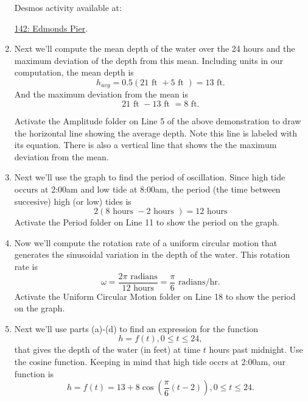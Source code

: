 \documentclass{ximera}
\begin{document}
\begin{example}
\begin{explanation}
\begin{enumerate}
Desmos activity available at:

\href{https://www.desmos.com/calculator/x2kocpkcfm}{142: Edmonds Pier}.

 
\begin{onlineOnly}
    \begin{center}
\end{center}
\end{onlineOnly}



\item Next we'll compute the mean depth of the water over the 24 hours and the maximum deviation of the depth from this mean. Including units in our computation, the mean depth is 
\[
    h_{avg} = 0.5 ( 21 \text{ ft } + 5 \text{ ft }) = 13 \text{ ft} . 
\]
And the maximum deviation from the mean is
\[
     21 \text{ ft } - 13 \text{ ft } = 8 \text{ ft}.
\]

Activate the Amplitude folder on Line 5 of the above demonstration to draw the horizontal line showing the average depth. Note this line is labeled with its equation. There is also a vertical line that shows the the maximum deviation from the mean.

\item Next we'll use the graph to find the period of oscillation. Since high tide occurs at 2:00am and low tide at 8:00am, the period (the time between succesive) high (or low) tides is
\[
    2(8 \text{ hours } - 2 \text{ hours }) = 12 \text{ hours}
\]
Activate the Period folder on Line 11 to show the period on the graph.

\item Now we'll compute the rotation rate of a uniform circular motion that generates the sinusoidal variation in the depth of the water. This rotation rate is
\[
  \omega = \frac{2\pi \text{ radians}}{12 \text{ hours}} = \frac{\pi}{6} \text{ radians/hr} .
\]
Activate the Uniform Circular Motion folder on Line 18 to show the period on the graph.

\item Next we'll use parts (a)-(d) to find an expression for the function 
\[
   h = f(t) ,  0\leq t \leq 24, 
\]
that gives the depth of the water (in feet) at time $t$ hours past midnight. Use the cosine function. Keeping in mind that high tide occrs at 2:00am, our function is 
\[
   h  = f(t) = 13 + 8 \cos \left(  \frac{\pi}{6} \left( t - 2 \right) \right),  0\leq t \leq 24.
\]




\end{enumerate}
\end{explanation}
\end{example}
\end{document}
